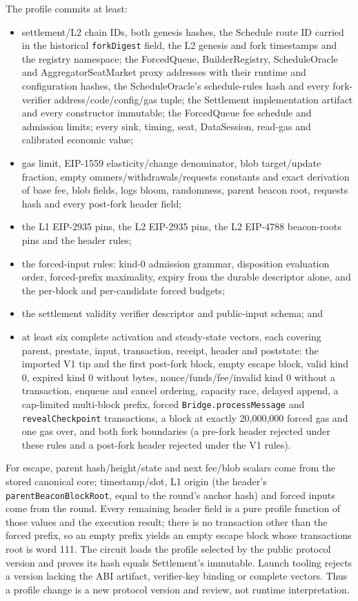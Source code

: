 \documentclass[a4paper,11pt]{article}
\newcommand{\code}[1]{\nolinkurl{#1}}
\begin{document}
The profile commits at least:
\begin{itemize}
\item settlement/L2 chain IDs, both genesis hashes, the Schedule route ID
  carried in the historical \code{forkDigest} field, the L2 genesis and fork
  timestamps and the registry namespace; the ForcedQueue, BuilderRegistry,
  ScheduleOracle and AggregatorSeatMarket proxy addresses with their runtime
  and configuration hashes, the ScheduleOracle's schedule-rules hash and every
  fork-verifier address/code/config/gas tuple; the Settlement implementation
  artifact and every constructor immutable; the ForcedQueue fee schedule and
  admission limits; every sink, timing, seat, DataSession, read-gas and
  calibrated economic value;
\item gas limit, EIP-1559 elasticity/change denominator, blob target/update
  fraction, empty ommers/withdrawals/requests constants and exact derivation of
  base fee, blob fields, logs bloom, randomness, parent beacon root, requests
  hash and every post-fork header field;
\item the L1 EIP-2935 pins, the L2 EIP-2935 pins, the L2 EIP-4788
  beacon-roots pins and the header rules;
\item the forced-input rules: kind-0 admission grammar, disposition
  evaluation order, forced-prefix maximality, expiry from the durable
  descriptor alone, and the per-block and per-candidate forced budgets;
\item the settlement validity verifier descriptor and public-input schema; and
\item at least six complete activation and steady-state vectors, each covering
  parent, prestate, input, transaction, receipt, header and poststate: the
  imported V1 tip and the first post-fork block, empty escape block, valid
  kind 0, expired kind 0 without bytes, nonce/funds/fee/invalid kind 0 without
  a transaction, enqueue and cancel ordering, capacity race, delayed append, a
  cap-limited multi-block prefix, forced \code{Bridge.processMessage} and
  \code{revealCheckpoint} transactions, a block at exactly 20,000,000 forced
  gas and one gas over, and both fork boundaries (a pre-fork header rejected
  under these rules and a post-fork header rejected under the V1 rules).
\end{itemize}

For escape, parent hash/height/state and next fee/blob scalars come from the
stored canonical core; timestamp/slot, L1 origin (the header's
\code{parentBeaconBlockRoot}, equal to the round's anchor hash) and forced
inputs come from the round.  Every remaining header field is a pure profile
function of those values and the execution result; there is no transaction
other than the forced prefix, so an empty prefix yields an empty escape block
whose transactions root is word 111.  The circuit loads the profile selected by
the public protocol version and proves its hash equals Settlement's immutable.
Launch tooling rejects a version lacking the ABI artifact, verifier-key
binding or complete vectors.  Thus a profile change is a new protocol version
and review, not runtime interpretation.
\end{document}
